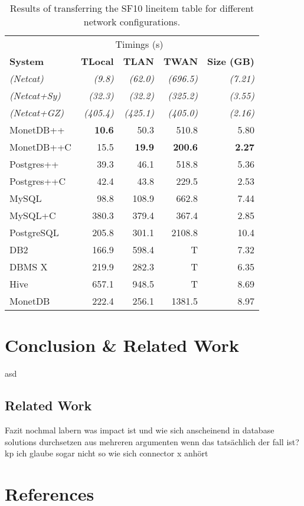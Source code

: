 \documentclass[sigconf]{acmart}
\begin{document}
\begin{table}[h!]
    \centering
    \caption{Results of transferring the SF10 lineitem table for different network configurations.}
    \begin{tabular}{ l | r  r  r  r }
    		 & \multicolumn{3}{c}{Timings (s)} &  \\ 
        \textbf{System} & \textbf{T{\small Local}} & \textbf{T{\small LAN}} & \textbf{T{\small WAN}} &  \textbf{Size (GB)}\\ \hline
        \textit{(Netcat)} & \textit{(9.8)} & \textit{(62.0)} & \textit{(696.5)} & \textit{(7.21)} \\ 
        \textit{(Netcat+Sy)} & \textit{(32.3)} & \textit{(32.2)} & \textit{(325.2)} & \textit{(3.55)} \\ 
        \textit{(Netcat+GZ)} & \textit{(405.4)} & \textit{(425.1)} & \textit{(405.0)} & \textit{(2.16)} \\ 
        MonetDB++ & \textbf{10.6} & 50.3 & 510.8 & 5.80 \\ 
        MonetDB++C & 15.5 & \textbf{19.9} & \textbf{200.6} & \textbf{2.27} \\ 
        Postgres++ & 39.3 & 46.1 & 518.8 & 5.36 \\ 
        Postgres++C & 42.4 & 43.8 & 229.5 & 2.53 \\ 
        MySQL & 98.8 & 108.9 & 662.8 & 7.44 \\ 
        MySQL+C & 380.3 & 379.4 & 367.4 & 2.85 \\ 
        PostgreSQL & 205.8 & 301.1 & 2108.8 & 10.4 \\ 
        DB2 & 166.9 & 598.4 & T & 7.32 \\ 
        DBMS X & 219.9 & 282.3 & T & 6.35 \\ 
        Hive & 657.1 & 948.5 & T & 8.69 \\ 
        MonetDB & 222.4 & 256.1 & 1381.5 & 8.97 \\ 
    \end{tabular}
\end{table}

\section{Conclusion \& Related Work}
asd
\subsection{Related Work}
Fazit nochmal labern was impact ist und wie sich anscheinend in database solutions durchsetzen aus mehreren argumenten wenn das tatsächlich der fall ist? kp
ich glaube sogar nicht so wie sich connector x anhört

\section{References}



\end{document}
